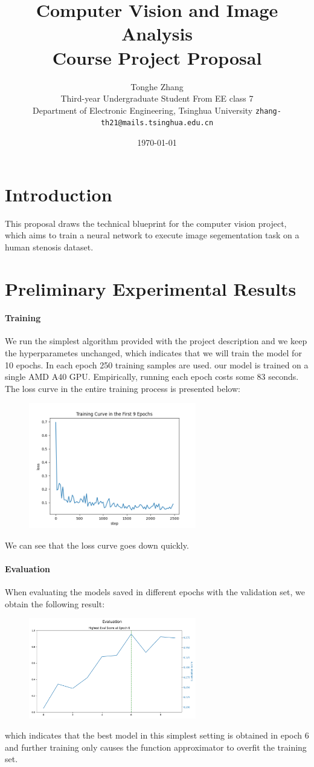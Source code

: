 \documentclass{article}
\title{
Computer Vision and Image Analysis
\protect\\
Course Project Proposal
}
\author{
    Tonghe Zhang    \\
    Third-year Undergraduate Student From EE class 7\\
    Department of Electronic Engineering, Tsinghua University
    \texttt{zhang-th21@mails.tsinghua.edu.cn}\\
}
\date{\today}
\begin{document}
\maketitle



\section{Introduction}
This proposal draws the technical blueprint for the computer vision project, which aims to 
train a neural network to execute image segementation task 
on a human stenosis dataset. 

\section{Preliminary Experimental Results}
\paragraph*{Training}
We run the simplest algorithm provided with the project description and we keep the hyperparametes unchanged, which indicates that we will train the model for 10 epochs. In each epoch 250 training samples are used.
our model is trained on a single AMD A40 GPU. Empirically, running each epoch costs some 83 seconds. The loss curve in the entire training process is presented below:
\begin{figure}[H]
    \centering
    \includegraphics[width=0.65\textwidth,height=0.35\textwidth]{loss_curve.png}
\end{figure}
We can see that the loss curve goes down quickly. 

\paragraph*{Evaluation}
When evaluating the models saved in different epochs with the validation set, we obtain the following result:
\begin{figure}[H]
    \centering
    \includegraphics[width=0.65\textwidth,height=0.35\textwidth]{eval.png}
\end{figure}
which indicates that the best model in this simplest setting is 
obtained in epoch 6 and further training only causes the function approximator 
to overfit the training set. 
\end{document}
